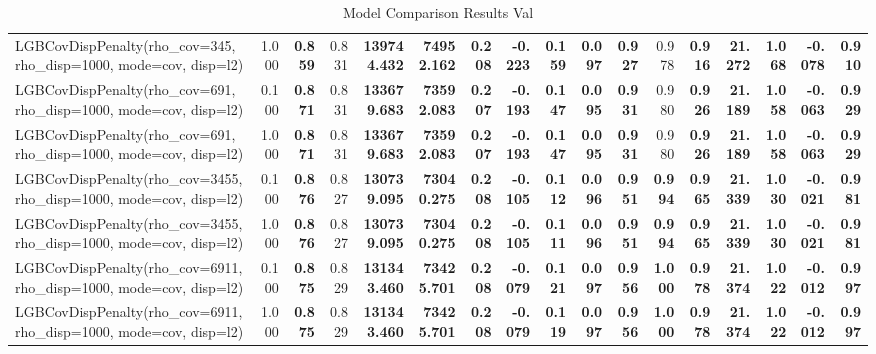\documentclass[11pt]{article}
\theoremstyle{plain}
\theoremstyle{definition}
\newcommand{\1}{\mathbf{1}}
\begin{document}
\begin{table}[htbp]
{\begin{tabular}{lrrrrrrrrrrrrrrrr}
LGBCovDispPenalty(rho_cov=345, rho_disp=1000, mode=cov, disp=l2) & 1.000 & \textbf{0.859} & 0.831 & \textbf{139744.432} & \textbf{74952.162} & \textbf{0.208} & \textbf{-0.223} & \textbf{0.159} & \textbf{0.097} & \textbf{0.927} & 0.978 & \textbf{0.916} & \textbf{21.272} & \textbf{1.068} & \textbf{-0.078} & \textbf{0.910} \\
LGBCovDispPenalty(rho_cov=691, rho_disp=1000, mode=cov, disp=l2) & 0.100 & \textbf{0.871} & 0.831 & \textbf{133679.683} & \textbf{73592.083} & \textbf{0.207} & \textbf{-0.193} & \textbf{0.147} & \textbf{0.095} & \textbf{0.931} & 0.980 & \textbf{0.926} & \textbf{21.189} & \textbf{1.058} & \textbf{-0.063} & \textbf{0.929} \\
LGBCovDispPenalty(rho_cov=691, rho_disp=1000, mode=cov, disp=l2) & 1.000 & \textbf{0.871} & 0.831 & \textbf{133679.683} & \textbf{73592.083} & \textbf{0.207} & \textbf{-0.193} & \textbf{0.147} & \textbf{0.095} & \textbf{0.931} & 0.980 & \textbf{0.926} & \textbf{21.189} & \textbf{1.058} & \textbf{-0.063} & \textbf{0.929} \\
LGBCovDispPenalty(rho_cov=3455, rho_disp=1000, mode=cov, disp=l2) & 0.100 & \textbf{0.876} & 0.827 & \textbf{130739.095} & \textbf{73040.275} & \textbf{0.208} & \textbf{-0.105} & \textbf{0.112} & \textbf{0.096} & \textbf{0.951} & \textbf{0.994} & \textbf{0.965} & \textbf{21.339} & \textbf{1.030} & \textbf{-0.021} & \textbf{0.981} \\
LGBCovDispPenalty(rho_cov=3455, rho_disp=1000, mode=cov, disp=l2) & 1.000 & \textbf{0.876} & 0.827 & \textbf{130739.095} & \textbf{73040.275} & \textbf{0.208} & \textbf{-0.105} & \textbf{0.111} & \textbf{0.096} & \textbf{0.951} & \textbf{0.994} & \textbf{0.965} & \textbf{21.339} & \textbf{1.030} & \textbf{-0.021} & \textbf{0.981} \\
LGBCovDispPenalty(rho_cov=6911, rho_disp=1000, mode=cov, disp=l2) & 0.100 & \textbf{0.875} & 0.829 & \textbf{131343.460} & \textbf{73425.701} & \textbf{0.208} & \textbf{-0.079} & \textbf{0.121} & \textbf{0.097} & \textbf{0.956} & \textbf{1.000} & \textbf{0.978} & \textbf{21.374} & \textbf{1.022} & \textbf{-0.012} & \textbf{0.997} \\
LGBCovDispPenalty(rho_cov=6911, rho_disp=1000, mode=cov, disp=l2) & 1.000 & \textbf{0.875} & 0.829 & \textbf{131343.460} & \textbf{73425.701} & \textbf{0.208} & \textbf{-0.079} & \textbf{0.119} & \textbf{0.097} & \textbf{0.956} & \textbf{1.000} & \textbf{0.978} & \textbf{21.374} & \textbf{1.022} & \textbf{-0.012} & \textbf{0.997} \\
\bottomrule
\end{tabular}
     }
    \caption{Model Comparison Results Val}
    \label{tab:model_comparison}
\end{table}
\end{document}
